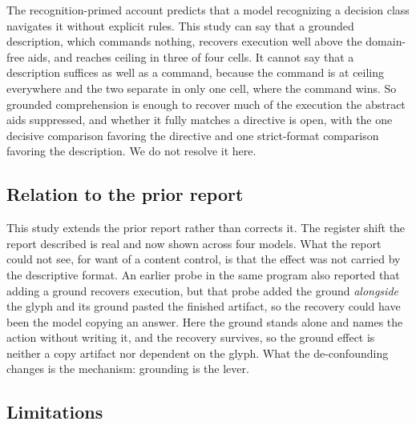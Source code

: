 \documentclass[11pt,a4paper]{article}
\begin{document}
The recognition-primed account predicts that a model recognizing a decision class
navigates it without explicit rules. This study can say that a grounded description,
which commands nothing, recovers execution well above the domain-free aids, and
reaches ceiling in three of four cells. It cannot say that a description suffices as
well as a command, because the command is at ceiling everywhere and the two separate
in only one cell, where the command wins. So grounded comprehension is enough to
recover much of the execution the abstract aids suppressed, and whether it fully
matches a directive is open, with the one decisive comparison favoring the directive
and one strict-format comparison favoring the description. We do not resolve it here.

\subsection{Relation to the prior report}

This study extends the prior report rather than corrects it. The register shift the
report described is real and now shown across four models. What the report could not
see, for want of a content control, is that the effect was not carried by the
descriptive format. An earlier probe in the same program also reported that adding a
ground recovers execution, but that probe added the ground \emph{alongside} the
glyph and its ground pasted the finished artifact, so the recovery could have been
the model copying an answer. Here the ground stands alone and names the action
without writing it, and the recovery survives, so the ground effect is neither a
copy artifact nor dependent on the glyph. What the de-confounding changes is the
mechanism: grounding is the lever.

\subsection{Limitations}\label{sec:limitations}
\end{document}
